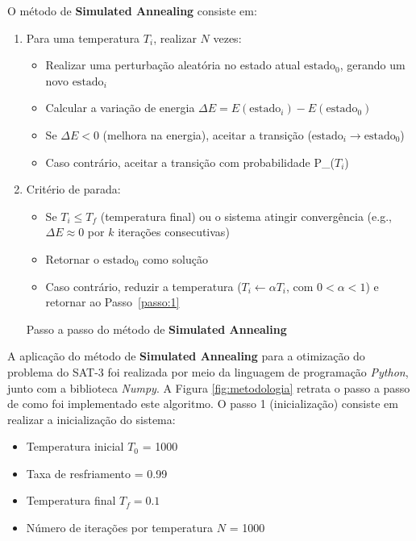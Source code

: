 \documentclass[12pt]{article}
\begin{document}
O método de \textbf{Simulated Annealing} consiste em:
\begin{enumerate}
  
  \item Para uma temperatura $T_i$, realizar $N$ vezes: \label{passo:1}
  \begin{itemize}
    \item Realizar uma perturbação aleatória no estado atual $\text{estado}_0$, gerando um novo $\text{estado}_i$
    \item Calcular a variação de energia $\Delta E = E(\text{estado}_i) - E(\text{estado}_0)$
    \item Se $\Delta E < 0$ (melhora na energia), aceitar a transição ($\text{estado}_i \rightarrow \text{estado}_0$)
    \item Caso contrário, aceitar a transição com probabilidade P_{}($T_i$)
  \end{itemize}
  
  \item Critério de parada:
  \begin{itemize}
    \item Se $T_i \leq T_f$ (temperatura final) ou o sistema atingir convergência (e.g., $\Delta E \approx 0$ por $k$ iterações consecutivas)
    \item Retornar o $\text{estado}_0$ como solução
    \item Caso contrário, reduzir a temperatura ($T_i \leftarrow \alpha T_i$, com $0 < \alpha < 1$) e retornar ao Passo~\ref{passo:1}
  \end{itemize}
  \label{pseudocodigo}
  \caption{Passo a passo do método de \textbf{Simulated Annealing}}
\end{enumerate} 

A aplicação do método de \textbf{Simulated Annealing} para a otimização do problema do SAT-3 foi realizada por meio da linguagem de programação \textit{Python}, junto com a biblioteca \textit{Numpy}.
%
A Figura \ref{fig:metodologia} retrata o passo a passo de como foi implementado este algoritmo.
%
O passo 1 (inicialização) consiste em realizar a inicialização do sistema:

\begin{itemize}
  \item Temperatura inicial $T_0$ = 1000
  \item Taxa de resfriamento \alpha = 0.99
  \item Temperatura final \(T_f = 0.1\)
  \item Número de iterações por temperatura $N$ = 1000
\end{itemize}
\end{document}
